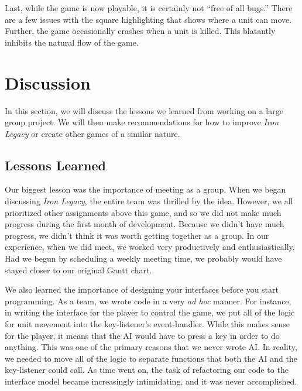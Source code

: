 \documentclass{article}
\begin{document}
Last, while the game is now playable, it is certainly not ``free of all bugs.''
    There are a few issues with the square highlighting that shows
    where a unit can move.
    Further, the game occasionally crashes when a unit is killed.
    This blatantly inhibits the natural flow of the game.

\section*{Discussion}

In this section, we will discuss the lessons we learned from working 
    on a large group project.
    We will then make recommendations for how to improve \emph{Iron Legacy}
    or create other games of a similar nature.

\subsection*{Lessons Learned}

Our biggest lesson was the importance of meeting as a group.
    When we began discussing \emph{Iron Legacy}, the entire team was thrilled
    by the idea.
    However, we all prioritized other assignments above this game,
    and so we did not make much progress during the first month of development.
    Because we didn't have much progress, we didn't think it was worth
    getting together as a group.
    In our experience, when we did meet, we worked very productively
    and enthusiastically.
    Had we begun by scheduling a weekly meeting time,
    we probably would have stayed closer to our original Gantt chart.

We also learned the importance of designing your interfaces before you start
    programming.
    As a team, we wrote code in a very \emph{ad hoc} manner.
    For instance, in writing the interface for the player to control the game,
    we put all of the logic for unit movement into the key-listener's
    event-handler.
    While this makes sense for the player, it means that the AI would have
    to press a key in order to do anything.
    This was one of the primary reasons that we never wrote AI.
    In reality, we needed to move all of the logic to separate functions that
    both the AI and the key-listener could call.
    As time went on, the task of refactoring our code to the interface model
    became increasingly intimidating, and it was never accomplished.
\end{document}
